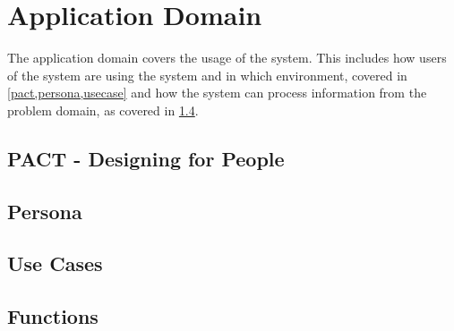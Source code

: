 \chapter{Application Domain}
The application domain covers the usage of the system. This includes
how users of the system are using the system and in which environment,
covered in \cref{pact,persona,usecase} and how the system can process
information from the problem domain, as covered in \cref{functions}.


\section{PACT - Designing for People}\label{pact}


\section{Persona}\label{persona}


\section{Use Cases}\label{usecase}


\section{Functions}\label{functions}

